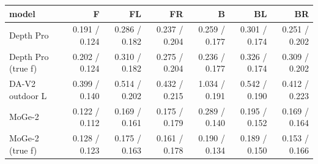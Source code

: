 \footnotesize\renewcommand{\arraystretch}{0.92}
\begin{tabular}{lrrrrrr}
\toprule
model & F & FL & FR & B & BL & BR \\
\midrule
Depth Pro & 0.191 / 0.124 & 0.286 / 0.182 & 0.237 / 0.204 & 0.259 / 0.177 & 0.301 / 0.174 & 0.251 / 0.202 \\
Depth Pro (true f) & 0.202 / 0.124 & 0.310 / 0.182 & 0.275 / 0.204 & 0.236 / 0.177 & 0.326 / 0.174 & 0.309 / 0.202 \\
DA-V2 outdoor L & 0.399 / 0.140 & 0.514 / 0.202 & 0.432 / 0.215 & 1.034 / 0.191 & 0.542 / 0.190 & 0.412 / 0.223 \\
MoGe-2 & 0.122 / 0.112 & 0.169 / 0.161 & 0.175 / 0.179 & 0.289 / 0.140 & 0.195 / 0.152 & 0.169 / 0.164 \\
MoGe-2 (true f) & 0.128 / 0.123 & 0.175 / 0.163 & 0.161 / 0.178 & 0.190 / 0.134 & 0.189 / 0.150 & 0.153 / 0.166 \\
\bottomrule
\end{tabular}
